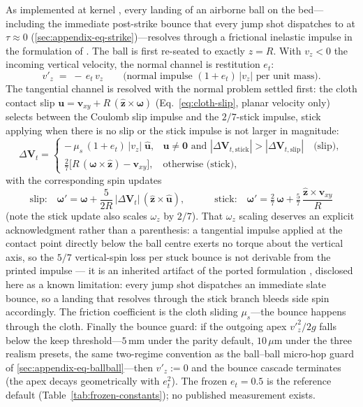 As implemented at kernel , every landing of an
airborne ball on the bed---including the immediate post-strike bounce
that every jump shot dispatches to at $\tau \approx 0$
(\ref{sec:appendix-eq-strike})---resolves through a frictional
inelastic impulse in the formulation of \citet{kiefl2024pooltool}. The
ball is first re-seated to exactly $z = R$. With $v_z < 0$ the incoming
vertical velocity, the normal channel is restitution $e_t$:
\begin{equation}
v'_z \;=\; -\,e_t\,v_z
\qquad\text{(normal impulse } (1 + e_t)\,|v_z| \text{ per unit mass)}.
\label{eq:slate-normal}
\end{equation}
The tangential channel is resolved with the normal problem settled
first: the cloth contact slip $\mathbf{u} = \mathbf{v}_{xy} +
R\,(\hat{\mathbf{z}} \times \boldsymbol{\omega})$
(Eq.~\eqref{eq:cloth-slip}, planar velocity only) selects between the
Coulomb slip impulse and the $2/7$-stick impulse, stick applying when
there is no slip or the stick impulse is not larger in magnitude:
\begin{equation}
\Delta\mathbf{V}_t =
\begin{cases}
-\,\mu_s\,(1+e_t)\,|v_z|\;\hat{\mathbf{u}}, &
\mathbf{u} \neq \mathbf{0} \text{ and }
|\Delta\mathbf{V}_{t,\mathrm{stick}}| >
|\Delta\mathbf{V}_{t,\mathrm{slip}}|
\quad\text{(slip)},\\[4pt]
\tfrac{2}{7}\bigl[R\,(\boldsymbol{\omega} \times \hat{\mathbf{z}}) -
\mathbf{v}_{xy}\bigr], & \text{otherwise (stick)},
\end{cases}
\label{eq:slate-tangential}
\end{equation}
with the corresponding spin updates
\begin{equation}
\text{slip:}\quad
\boldsymbol{\omega}' = \boldsymbol{\omega} +
\frac{5}{2R}\,|\Delta\mathbf{V}_t|\,
(\hat{\mathbf{z}} \times \hat{\mathbf{u}}),
\qquad\quad
\text{stick:}\quad
\boldsymbol{\omega}' = \tfrac{2}{7}\,\boldsymbol{\omega} +
\tfrac{5}{7}\,\frac{\hat{\mathbf{z}} \times \mathbf{v}_{xy}}{R}
\label{eq:slate-spin}
\end{equation}
(note the stick update also scales $\omega_z$ by $2/7$). That
$\omega_z$ scaling deserves an explicit acknowledgment rather than a
parenthesis: a tangential impulse applied at the contact point directly
below the ball centre exerts no torque about the vertical axis, so the
$5/7$ vertical-spin loss per stuck bounce is not derivable from the
printed impulse --- it is an inherited artifact of the ported
formulation \citep{kiefl2024pooltool}, disclosed here as a known
limitation: every jump shot dispatches an immediate slate bounce, so a
landing that resolves through the stick branch bleeds side spin
accordingly. The friction
coefficient is the cloth sliding $\mu_s$---the bounce happens through
the cloth. Finally the bounce guard: if the outgoing apex
$v'^{2}_z/2g$ falls below the keep threshold---$5$\,mm under the
parity default, $10\,\mu$m under the three realism presets, the same
two-regime convention as the ball--ball micro-hop guard of
\ref{sec:appendix-eq-ballball}---then $v'_z := 0$ and the bounce
cascade terminates (the apex decays geometrically with $e_t^{2}$). The
frozen $e_t = 0.5$ is the reference default
(Table~\ref{tab:frozen-constants}); no published measurement exists.

